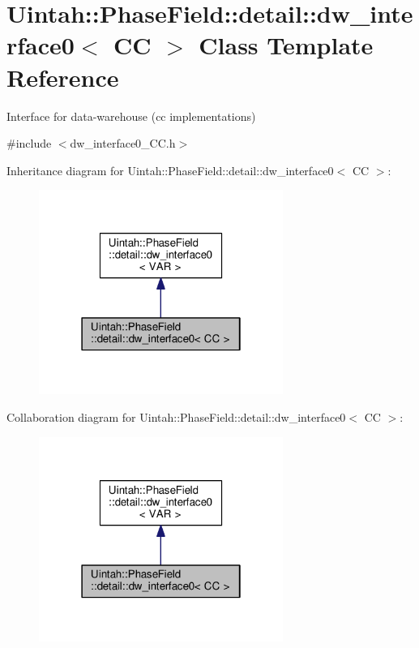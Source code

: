 \hypertarget{classUintah_1_1PhaseField_1_1detail_1_1dw__interface0_3_01CC_01_4}{}\section{Uintah\+:\+:Phase\+Field\+:\+:detail\+:\+:dw\+\_\+interface0$<$ CC $>$ Class Template Reference}
\label{classUintah_1_1PhaseField_1_1detail_1_1dw__interface0_3_01CC_01_4}


Interface for data-\/warehouse (cc implementations)  




{\ttfamily \#include $<$dw\+\_\+interface0\+\_\+\+C\+C.\+h$>$}



Inheritance diagram for Uintah\+:\+:Phase\+Field\+:\+:detail\+:\+:dw\+\_\+interface0$<$ CC $>$\+:\nopagebreak
\begin{figure}[H]
\begin{center}
\leavevmode
\includegraphics[width=226pt]{classUintah_1_1PhaseField_1_1detail_1_1dw__interface0_3_01CC_01_4__inherit__graph}
\end{center}
\end{figure}


Collaboration diagram for Uintah\+:\+:Phase\+Field\+:\+:detail\+:\+:dw\+\_\+interface0$<$ CC $>$\+:\nopagebreak
\begin{figure}[H]
\begin{center}
\leavevmode
\includegraphics[width=226pt]{classUintah_1_1PhaseField_1_1detail_1_1dw__interface0_3_01CC_01_4__coll__graph}
\end{center}
\end{figure}
